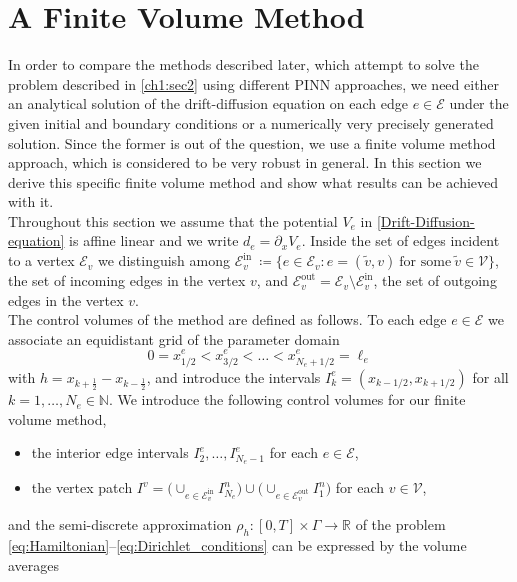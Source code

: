 \chapter{A Finite Volume Method}
\label{ch2}

In order to compare the methods described later, which attempt to solve the problem described in \cref{ch1:sec2} using different PINN approaches, we need either an analytical solution of the drift-diffusion equation on each edge $e \in \mathcal{E}$ under the given initial and boundary conditions or a numerically very precisely generated solution. Since the former is out of the question, we use a finite volume method approach, which is considered to be very robust in general. In this section we derive this specific finite volume method and show what results can be achieved with it.  \\
Throughout this section we assume that the potential $V_e$ in \cref{Drift-Diffusion-equation} is affine linear and we write $d_e = \partial_x V_e$. Inside the set of edges incident to a vertex $\mathcal{E}_v$ we distinguish among $\mathcal{E}_v^{\text{in}} \ \coloneqq \{ e \in \mathcal{E}_v \colon e = ( \widetilde{v}, v ) \ \text{for some} \ \widetilde{v} \in \mathcal{V} \}$, the set of incoming edges in the vertex $v$, and $\mathcal{E}_v^{\text{out}} = \mathcal{E}_v \setminus \mathcal{E}_v^{\text{in}}$, the set of outgoing edges in the vertex $v$. \\
The control volumes of the method are defined as follows. To each edge $e \in \mathcal{E}$ we associate an equidistant grid of the parameter domain
\begin{equation*}
	0 = x^e_{1/2} < x^e_{3/2} <\ldots < x^e_{N_e+1/2} = \ell_e
\end{equation*}
with $h = x_{k+\frac{1}{2}} - x_{k-\frac{1}{2}}$, and introduce the intervals $I_k^e = (x_{k-1/2}, x_{k+1/2})$ for all $k=1,\ldots,N_e \in \mathbb{N}$. We introduce the following control volumes for our finite volume method,
\begin{itemize}
	\item the interior edge intervals $I_2^e, \ldots, I_{N_e-1}^e$ for
	each $e \in \mathcal{E}$,
	\item the vertex patch $I^v = \big(\cup_{e\in \mathcal{E}_v^{\text{in}}} I_{N_e}^n\big) \cup \big(\cup_{e\in \mathcal{E}_v^{\text{out}}} I_1^n\big)$ for
	each $v \in \mathcal{V}$,
\end{itemize}
and the semi-discrete approximation $\rho_h \colon [0,T] \times \Gamma \to \mathbb{R}$ of the problem \eqref{eq:Hamiltonian}--\eqref{eq:Dirichlet_conditions} can be expressed by the volume averages 
